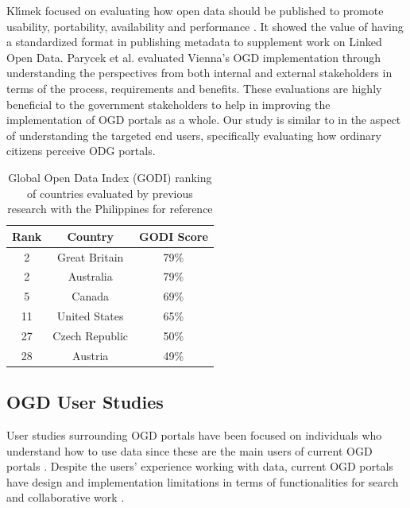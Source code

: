 \documentclass{sigchi}
\begin{document}
Kl{\'\i}mek focused on evaluating how open data should be published to promote usability, portability, availability and performance \cite{klimek2019dcat}. It showed the value of having a standardized format in publishing metadata to supplement work on Linked Open Data. Parycek et al. \cite{Parycek2014} evaluated Vienna's OGD implementation through understanding the perspectives from both internal and external stakeholders in terms of the process, requirements and benefits. These evaluations are highly beneficial to the government stakeholders to help in improving the implementation of OGD portals as a whole. Our study is similar to \cite{Parycek2014} in the aspect of understanding the targeted end users, specifically evaluating how ordinary citizens perceive ODG portals.

\begin{table}
    \centering
    \begin{tabular}{c c c}
         \textbf{Rank} & \textbf{Country} & \textbf{GODI Score} \\
         \midrule
         2 & Great Britain & 79\% \\
         2 & Australia & 79\% \\
         5 & Canada & 69\% \\
         11 & United States & 65\% \\
         27 & Czech Republic & 50\% \\
         28 & Austria & 49\% \\ 
    \end{tabular}
    \caption{Global Open Data Index (GODI) ranking of countries evaluated by previous research with the Philippines for reference}
    \label{tab:godi}
\end{table}

\subsection{OGD User Studies}
User studies surrounding OGD portals have been focused on individuals who understand how to use data since these are the main users of current OGD portals \cite{choi2017characteristics,kacprzak2019characterising, koesten2019collaborative, koesten2017trials}. Despite the users' experience working with data, current OGD portals have design and implementation limitations in terms of functionalities for search \cite{kacprzak2019characterising, koesten2017trials} and collaborative work \cite{choi2017characteristics, koesten2019collaborative}.
\end{document}
